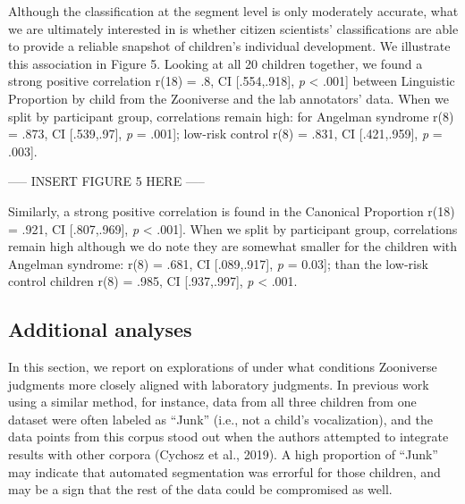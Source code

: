 \documentclass[english,,man]{apa6}
\begin{document}
Although the classification at the segment level is only moderately accurate, what we are ultimately interested in is whether citizen scientists' classifications are able to provide a reliable snapshot of children's individual development. We illustrate this association in Figure 5. Looking at all 20 children together, we found a strong positive correlation r(18) = .8, CI {[}.554,.918{]}, \emph{p} \textless{} .001{]} between Linguistic Proportion by child from the Zooniverse and the lab annotators' data. When we split by participant group, correlations remain high: for Angelman syndrome r(8) = .873, CI {[}.539,.97{]}, \emph{p} = .001{]}; low-risk control r(8) = .831, CI {[}.421,.959{]}, \emph{p} = .003{]}.

----- INSERT FIGURE 5 HERE -----

Similarly, a strong positive correlation is found in the Canonical Proportion r(18) = .921, CI {[}.807,.969{]}, \emph{p} \textless{} .001{]}. When we split by participant group, correlations remain high although we do note they are somewhat smaller for the children with Angelman syndrome: r(8) = .681, CI {[}.089,.917{]}, \emph{p} = 0.03{]}; than the low-risk control children r(8) = .985, CI {[}.937,.997{]}, \emph{p} \textless{} .001.

\hypertarget{additional-analyses}{%
\subsection{Additional analyses}\label{additional-analyses}}

In this section, we report on explorations of under what conditions Zooniverse judgments more closely aligned with laboratory judgments. In previous work using a similar method, for instance, data from all three children from one dataset were often labeled as \enquote{Junk} (i.e., not a child's vocalization), and the data points from this corpus stood out when the authors attempted to integrate results with other corpora (Cychosz et al., 2019). A high proportion of \enquote{Junk} may indicate that automated segmentation was errorful for those children, and may be a sign that the rest of the data could be compromised as well.
\end{document}
